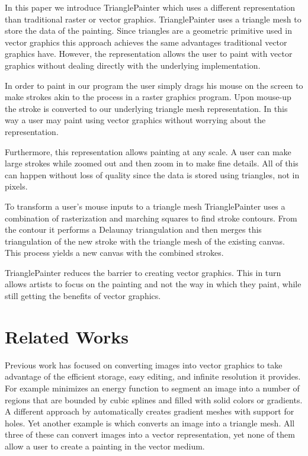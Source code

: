\documentclass[review]{acmsiggraph}
\begin{document}
In this paper we introduce TrianglePainter which  
uses a different representation than traditional raster or vector graphics.
TrianglePainter uses a triangle mesh to store the data of the painting.
Since triangles are a geometric primitive used in vector graphics this approach achieves the
same advantages traditional vector graphics have. However, the representation allows the
user to paint with vector graphics without dealing directly with the underlying implementation.

In order to paint in our program the user simply drags his mouse on the screen to make
strokes akin to the process in a raster graphics program. Upon mouse-up the stroke is
converted to our underlying triangle mesh representation. In this way a user may paint using
vector graphics without worrying about the representation.

Furthermore, this representation allows painting at any scale. A user can make large strokes
while zoomed out and then zoom in to make fine details. All of this can happen without
loss of quality since the data is stored using triangles, not in pixels.

To transform a user's mouse inputs to a triangle mesh
TrianglePainter uses a combination of rasterization and marching squares to
find stroke contours. From the contour it performs a Delaunay triangulation
and then merges this triangulation
of the new stroke with the triangle mesh of the existing canvas. This process yields
a new canvas with the combined strokes.

TrianglePainter reduces the barrier to creating vector graphics. This in turn allows 
artists to focus on the painting and not the way in which they paint, while still 
getting the benefits of vector graphics.

\section{Related Works}

Previous work has focused on converting images into vector graphics to take advantage of the
efficient storage, easy editing, and infinite resolution it provides. For example \cite{lecot:ARD:2006}
minimizes an energy function to segment an image into a number of regions that are bounded
by cubic splines and filled with solid colors or gradients. A different approach by \cite{Lai:2009:ATG:1531326.1531391} 
automatically creates gradient meshes with support for holes. Yet another example is \cite{10.1109/TVCG.2012.76} 
which converts an image into a triangle mesh. All three of these can convert images into
a vector representation, yet none of them allow a user to create a painting in the vector medium.
\end{document}
